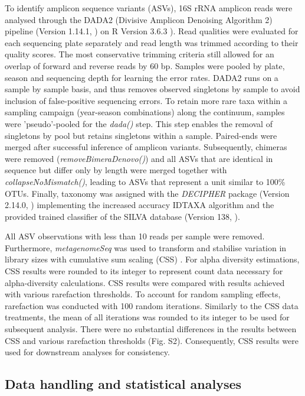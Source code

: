 \documentclass[12pt,a4paper]{article} %
\begin{document}
To identify amplicon sequence variants (ASVs), 16S rRNA amplicon reads were analysed through the DADA2 (Divisive Amplicon Denoising Algorithm 2) pipeline (Version 1.14.1, \citet{Callahan2017}) on R Version 3.6.3 \citep{RCoreTeam2017}). Read qualities were evaluated for each sequencing plate separately and read length was trimmed according to their quality scores. The most conservative trimming criteria still allowed for an overlap of forward and reverse reads by 60 bp. Samples were pooled by plate, season and sequencing depth for learning the error rates. DADA2 runs on a sample by sample basis, and thus removes observed singletons by sample to avoid inclusion of false-positive sequencing errors. To retain more rare taxa within a sampling campaign (year-season combinations) along the continuum, samples were 'pseudo'-pooled for the \textit{dada()} step.  This step enables the removal of singletons by pool but retains singletons within a sample. Paired-ends were merged after successful inference of amplicon variants. Subsequently, chimeras were removed (\textit{removeBimeraDenovo()}) and all ASVs that are identical in sequence but differ only by length were merged together with \textit{collapseNoMismatch()}, leading to ASVs that represent a unit similar to 100\% OTUs. Finally, taxonomy was assigned with the \textit{DECIPHER} package (Version 2.14.0, \citet{Wright2016}) implementing the increased accuracy IDTAXA algorithm \citep{Murali2018} and the provided trained classifier of the SILVA database (Version 138, \citet{Pruesse2007}).

All ASV observations with less than 10 reads per sample were removed. Furthermore, \textit{metagenomeSeq} was used to transform and stabilise variation in library sizes with cumulative sum scaling (CSS) \citep{Paulson2013}. For alpha diversity estimations, CSS results were rounded to its integer to represent count data necessary for alpha-diversity calculations. CSS results were compared with results achieved with various rarefaction thresholds. To account for random sampling effects, rarefaction was conducted with 100 random iterations. Similarly to the CSS data treatments, the mean of all iterations was rounded to its integer to be used for subsequent analysis. There were no substantial differences in the results between CSS and various rarefaction thresholds (Fig. S2). Consequently, CSS results were used for downstream analyses for consistency.

\subsection*{Data handling and statistical analyses}
\end{document}
